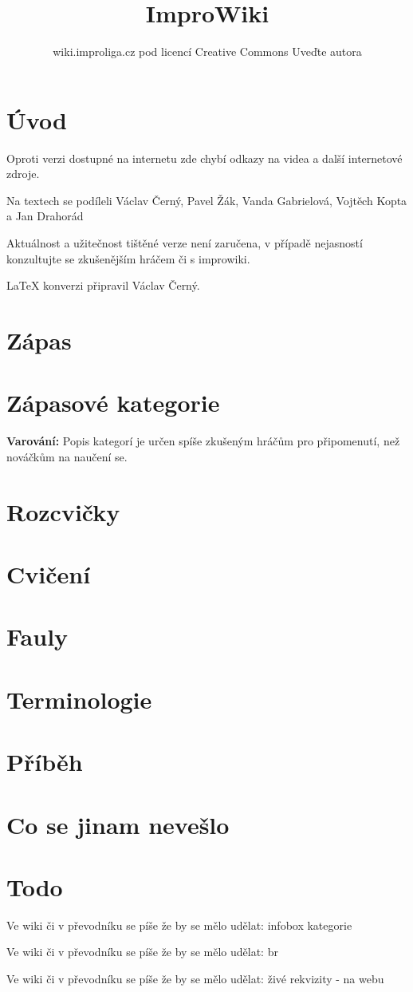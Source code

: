 \documentclass[a4paper,8pt]{book}
\title{ImproWiki}
\author{wiki.improliga.cz pod licencí Creative Commons Uveďte autora}
\newcommand{\todo}[1]{
Ve wiki či v převodníku se píše že by se mělo udělat: #1 
}
\begin{document}
\begin{titlepage}
\maketitle
\end{titlepage}
 
\chapter{Úvod}\label{úvod}


Oproti verzi dostupné na internetu zde chybí odkazy na videa a další internetové zdroje.

Na textech se podíleli Václav Černý, Pavel Žák, Vanda Gabrielová, Vojtěch Kopta a Jan Drahorád

Aktuálnost a užitečnost tištěné verze není zaručena, v případě nejasností konzultujte se zkušenějším hráčem či s improwiki.


\LaTeX{} konverzi připravil  Václav Černý. 
\chapter{Zápas}



\chapter{Zápasové kategorie}\label{zápasové kategorie}
\textbf{Varování:} Popis kategorí je určen spíše zkušeným hráčům pro připomenutí, než nováčkům na naučení se.  


\chapter{Rozcvičky}\label{rozcvičky}


\chapter{Cvičení}\label{cvičení}


\chapter{Fauly}\label{fauly}


\chapter{Terminologie}\label{terminologie}



\chapter{Příběh}\label{pribeh}


\chapter{Co se jinam nevešlo}\label{co se jinam nevešlo}

\chapter{Todo}
\todo{infobox kategorie}

\todo{br}

\todo{živé rekvizity - na webu}

\setcounter{tocdepth}{1}
\tableofcontents
\end{document}
